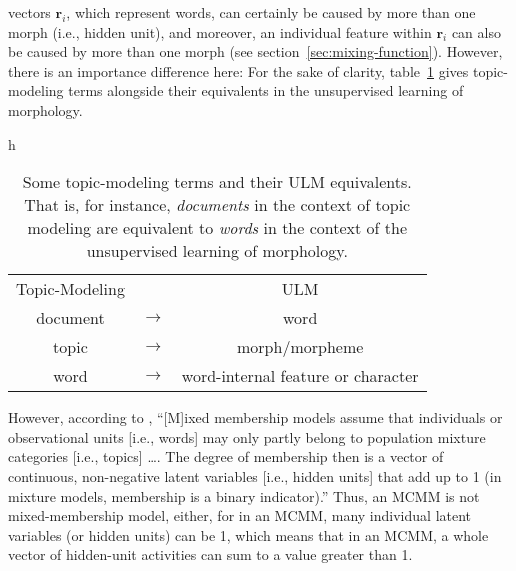 vectors $\textbf{r}_i$, which represent words, can certainly be caused by more than one morph (i.e., hidden unit), and moreover, an individual feature within $\textbf{r}_i$ can also be caused by more than one morph (see section~\ref{sec:mixing-function}). However, there is an importance difference here: 
 For the sake of clarity, table~\ref{tab:tm-to-ulm} gives topic-modeling terms alongside their equivalents in the unsupervised learning of morphology.
\begin{table}{h}
\centering
\begin{tabular}{ccc}
Topic-Modeling & & ULM \\
document & $\to$ & word \\ %
topic & $\to$ & morph/morpheme \\
word & $\to$ & word-internal feature or character \\
\end{tabular}
\caption{Some topic-modeling terms and their ULM equivalents. That is, for instance, \emph{documents}
in the context of topic modeling are equivalent to \emph{words} in the context of the unsupervised learning
of morphology.}
\label{tab:tm-to-ulm}
\end{table}
However, according to \citet[][p. 4]{airoldi-et-al:2014}, ``[M]ixed membership models assume that individuals or observational units [i.e., words] may only partly belong to population mixture categories [i.e., topics] \dots. The degree of membership then is a vector of continuous, non-negative latent variables [i.e., hidden units] that add up to 1 (in mixture models, membership is a binary indicator).''
 Thus, an MCMM is not mixed-membership model, either, for in an MCMM, many individual latent variables (or hidden units) can be 1, which means that in an MCMM, a whole vector of hidden-unit activities can sum to a value greater than 1.


